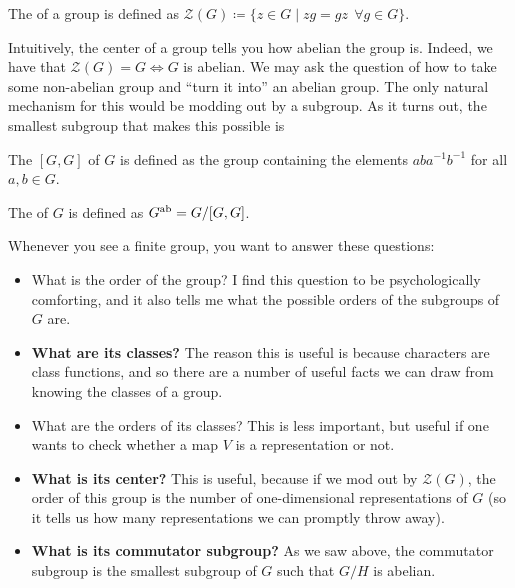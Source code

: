 \documentclass[11pt]{article}
\begin{document}
\begin{definition}
    The  of a group is defined as
    $\mathcal{Z}(G) \coloneqq \{ z \in G \mid zg = gz \: \: \forall g \in G \}$.
\end{definition}

\noin
Intuitively, the center of a group tells you how abelian the group is.
Indeed, we have that $\mathcal{Z}(G) = G \iff G$ is abelian.
We may ask the question of how to take some non-abelian group
and ``turn it into'' an abelian group. The only natural mechanism
for this would be modding out by a subgroup. As it turns out,
the smallest subgroup that makes this possible is

\begin{definition}
    The  $[G, G]$ of $G$ is
    defined as the group containing the elements $ab a^{-1} b^{-1}$
    for all $a, b \in G$.
\end{definition}

\begin{definition}
    The  of $G$ is defined as $G^{\rm ab} = G/[G, G]$.
\end{definition}



\begin{iidea}
    Whenever you see a finite group, you want to answer these questions:
    \begin{itemize}
        \item What is the order of the group? I find this question to be 
        psychologically comforting, and it also tells me what the possible 
        orders of the subgroups of $G$ are.
        \item \textbf{What are its classes?} The reason this is useful is because
        characters are class functions, and so there are a number of useful facts we can
        draw from knowing the classes of a group.
        \item What are the orders of its classes? This is less important, but useful
        if one wants to check whether a map $V$ is a representation or not.
        \item \textbf{What is its center?}  This is useful, because if we mod out 
        by $\mathcal{Z}(G)$, the order of this group is the number of one-dimensional 
        representations of $G$ (so it tells us how many representations we can 
        promptly throw away).
        \item \textbf{What is its commutator subgroup?} As we saw above, the commutator
        subgroup is the smallest subgroup of $G$ such that $G/H$ is abelian.
    \end{itemize}
\end{iidea}
\end{document}
